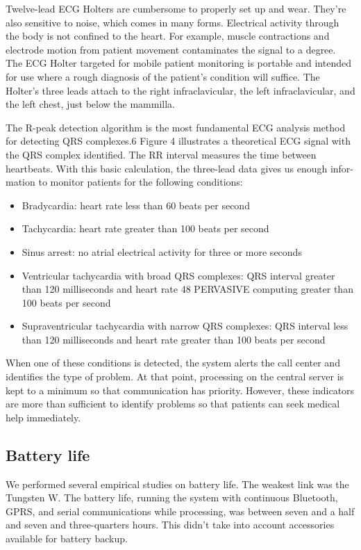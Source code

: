 \documentclass[a4paper,12pt]{article}
\begin{document}
Twelve-lead ECG Holters are cumbersome to properly set up and wear. They’re also sensitive to noise, which comes in many forms. Electrical activity through the body is not confined to the heart. For example, muscle contractions and electrode motion from patient movement contaminates the signal to a degree. The ECG Holter targeted for mobile patient monitoring is portable and intended for use where a rough diagnosis of the patient’s condition will suffice. The Holter’s three leads attach to the right infraclavicular, the left infraclavicular, and the left chest, just below the mammilla.

The R-peak detection algorithm is the most fundamental ECG analysis method for detecting QRS complexes.6 Figure 4 illustrates a theoretical ECG signal with the QRS complex identified. The RR interval measures the time between heartbeats. With this basic calculation, the three-lead data gives us enough infor- mation to monitor patients for the following conditions:
\begin{itemize}
	\item Bradycardia: heart rate less than 60 beats per second
	\item Tachycardia: heart rate greater than 100 beats per second
	\item Sinus arrest: no atrial electrical activity for three or more seconds
	\item Ventricular tachycardia with broad QRS complexes: QRS interval greater than 120 milliseconds and heart rate 48 PERVASIVE computing greater than 100 beats per second
	\item Supraventricular tachycardia with narrow QRS complexes: QRS interval less than 120 milliseconds and heart rate greater than 100 beats per second
\end{itemize}

When one of these conditions is detected, the system alerts the call center and identifies the type of problem. At that point, processing on the central server is kept to a minimum so that communication has priority. However, these indicators are more than sufficient to identify problems so that patients can seek medical help immediately.

\subsection{Battery life}


We performed several empirical studies on battery life. The weakest link was the Tungsten W. The battery life, running the system with continuous Bluetooth, GPRS, and serial communications while processing, was between seven and a half and seven and three-quarters hours. This didn’t take into account accessories available for battery backup.
\end{document}
